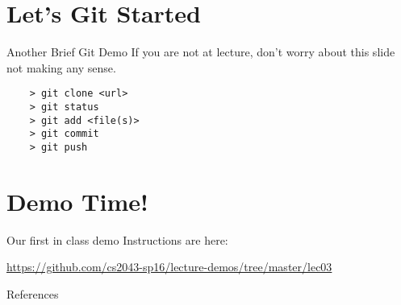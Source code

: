 \documentclass[11pt]{beamer}
\def\wl{\par \vspace{\baselineskip}}                        %
\begin{document}
%
\section{Let's Git Started}
\label{sec:let_s_git_started}

\begin{frame}[fragile]{Another Brief Git Demo}
  If you are not at lecture, don't worry about this slide not making any sense.\wl

  \begin{verbatim}
    > git clone <url>
    > git status
    > git add <file(s)>
    > git commit
    > git push
  \end{verbatim}
\end{frame}

%

%
\section{Demo Time!}
\label{sec:demo_time_}
\begin{frame}[fragile]{Our first in class demo}
  Instructions are here:\wl

  {\small \href{https://github.com/cs2043-sp16/lecture-demos/tree/master/lec03}{https://github.com/cs2043-sp16/lecture-demos/tree/master/lec03}}
\end{frame}
%

\begin{frame}[allowframebreaks]{References}
  
  
\end{frame}
\end{document}

